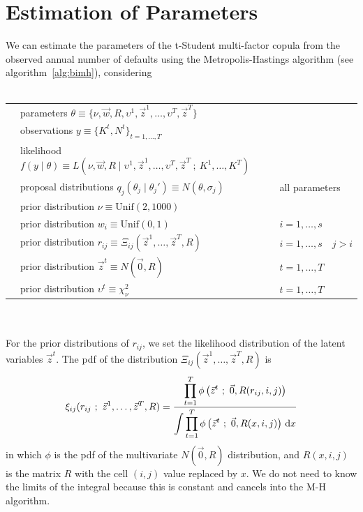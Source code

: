 \documentclass[11pt,fleqn]{book} %
\begin{document}
\section{Estimation of Parameters}

\begin{proposition}
	\label{prop:pemh}
	We can estimate the parameters of the t-Student multi-factor copula from 
	the observed annual number of defaults using the Metropolis-Hastings 
	algorithm (see algorithm~\ref{alg:bimh}), considering
~\\
~\\
\begin{listliketab} 
	\begin{tabular}{Lll}
		\textbullet & parameters $\theta \equiv \{ \nu,\vec{w},R,\upsilon^1,\vec{z}^1,\dots,\upsilon^T,\vec{z}^T\}$ & \\
		\textbullet & observations $y \equiv \{K^t, N^t\}_{t=1,\dots,T}$ & \\
		\textbullet & likelihood $f(y \mid \theta) \equiv L(\nu,\vec{w},R  \mid \upsilon^1,\vec{z}^1,\dots,\upsilon^T,\vec{z}^T\ ;\ K^1,\dots,K^T)$ & \\
		\textbullet & proposal distributions $q_j(\theta_j \mid \theta_j') \equiv N(\theta,\sigma_j)$ & all parameters\\
		\textbullet & prior distribution $\nu \equiv \text{Unif}(2,1000)$ & \\
		\textbullet & prior distribution $w_i \equiv \text{Unif}(0,1)$ & $i=1,\dots,s$ \\
		\textbullet & prior distribution $r_{ij} \equiv \Xi_{ij}(\vec{z}^1,\dots,\vec{z}^T,R)$ & $i=1,\dots,s \quad j>i$ \\ %
		\textbullet & prior distribution $\vec{z}^t \equiv N(\vec{0},R)$ & $t=1,\dots,T$ \\
		\textbullet & prior distribution $\upsilon^t \equiv \chi_{\nu}^2$ & $t=1,\dots,T$ \\
	\end{tabular}
\end{listliketab}
~\\
~\\
	For the prior distributions of $r_{ij}$, we set the likelihood distribution
	of the latent variables $\vec{z}^t$. The pdf of the distribution 
	$\Xi_{ij}(\vec{z}^1,\dots,\vec{z}^T,R)$ is
	\begin{displaymath}
		\xi_{ij}(r_{ij}\ ;\ \vec{z}^1,\dots,\vec{z}^T,R) = \frac
		{\displaystyle \prod_{t=1}^{T} \phi\left( \vec{z}^t\ ;\ \vec{0}, R(r_{ij},i,j) \right)}
		{\displaystyle \int \prod_{t=1}^{T} \phi\left( \vec{z}^t\ ;\ \vec{0}, R(x,i,j) \right) \ud x}
	\end{displaymath}
	in which $\phi$ is the pdf of the multivariate $N(\vec{0},R)$ distribution,
	and $R(x,i,j)$ is the matrix $R$ with the cell $(i,j)$ value 
	replaced by $x$. We do not need to know the limits of the integral
	because this is constant and cancels into the M-H algorithm.
\end{proposition}
\end{document}
